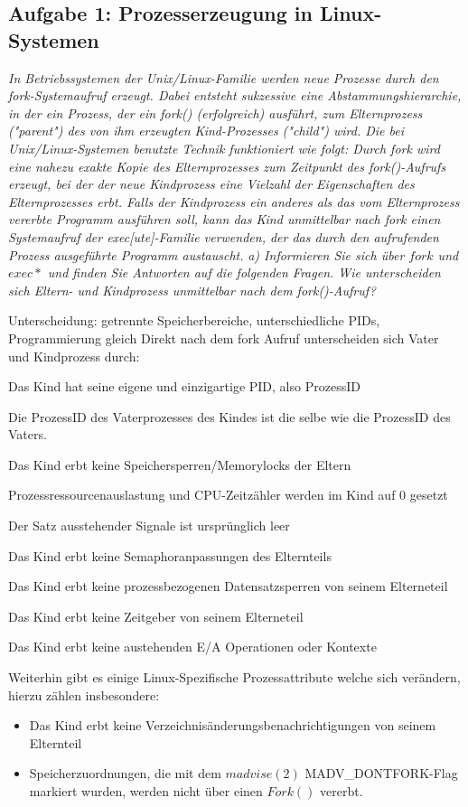 \documentclass[a4paper]{article}
\begin{document}
\subsection{Aufgabe 1: Prozesserzeugung in Linux-Systemen}
\textit{In Betriebssystemen der Unix/Linux-Familie werden neue Prozesse durch den fork-Systemaufruf erzeugt. Dabei entsteht sukzessive eine Abstammungshierarchie, in der ein Prozess, der ein fork() (erfolgreich) ausführt, zum Elternprozess ("parent") des von ihm erzeugten Kind-Prozesses ("child") wird. Die bei Unix/Linux-Systemen benutzte Technik funktioniert wie folgt: Durch fork wird eine nahezu exakte Kopie des Elternprozesses zum Zeitpunkt des fork()-Aufrufs erzeugt, bei der der neue Kindprozess eine Vielzahl der Eigenschaften des Elternprozesses erbt. Falls der Kindprozess ein anderes als das vom Elternprozess vererbte Programm ausführen soll, kann das Kind unmittelbar nach fork einen Systemaufruf der exec[ute]-Familie verwenden, der das durch den aufrufenden Prozess ausgeführte Programm austauscht.}
\vspace{10mm}
\textit{a) Informieren Sie sich über $fork$ und $exec*$ und finden Sie Antworten auf die folgenden Fragen. Wie unterscheiden sich Eltern- und Kindprozess unmittelbar nach dem fork()-Aufruf?}

Unterscheidung: getrennte Speicherbereiche, unterschiedliche PIDs, Programmierung gleich
Direkt nach dem fork Aufruf unterscheiden sich Vater und Kindprozess durch:
\begin{itemize*}
    \item Das Kind hat seine eigene und einzigartige PID, also ProzessID
    \item Die ProzessID des Vaterprozesses des Kindes ist die selbe wie die ProzessID des Vaters.
    \item Das Kind erbt keine Speichersperren/Memorylocks der Eltern
    \item Prozessressourcenauslastung und CPU-Zeitzähler werden im Kind auf 0 gesetzt
    \item Der Satz ausstehender Signale ist ursprünglich leer
    \item Das Kind erbt keine Semaphoranpassungen des Elternteils
    \item Das Kind erbt keine prozessbezogenen Datensatzsperren von seinem Elterneteil
    \item Das Kind erbt keine Zeitgeber von seinem Elterneteil
    \item Das Kind erbt keine austehenden E/A Operationen oder Kontexte
\end{itemize*}
Weiterhin gibt es einige Linux-Spezifische Prozessattribute welche sich verändern, hierzu zählen insbesondere:
\begin{itemize}
    \item Das Kind erbt keine Verzeichnisänderungsbenachrichtigungen von seinem Elternteil
    \item Speicherzuordnungen, die mit dem $madvise(2)$ MADV\_DONTFORK-Flag markiert wurden, werden nicht über einen $Fork()$ vererbt.
\end{itemize}
\end{document}
